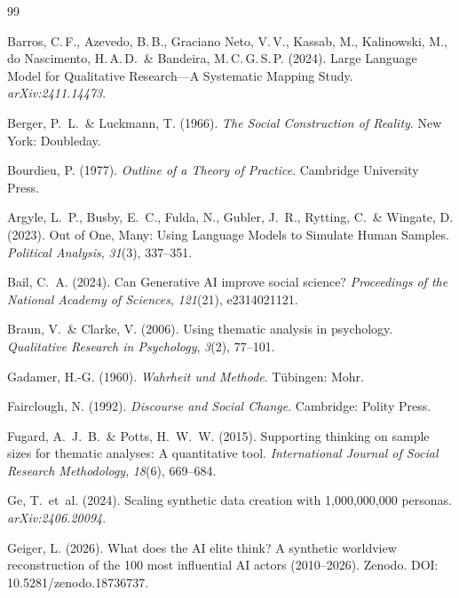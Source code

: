 \documentclass[11pt,a4paper]{article}
\begin{document}

\begin{thebibliography}{99}

  Barros, C.\,F., Azevedo, B.\,B., Graciano Neto, V.\,V., Kassab, M., Kalinowski, M., do Nascimento, H.\,A.\,D.~\& Bandeira, M.\,C.\,G.\,S.\,P. (2024).
  Large Language Model for Qualitative Research---A Systematic Mapping Study.
  \textit{arXiv:2411.14473}.

  Berger, P.~L.~\& Luckmann, T. (1966).
  \textit{The Social Construction of Reality}.
  New York: Doubleday.

  Bourdieu, P. (1977).
  \textit{Outline of a Theory of Practice}.
  Cambridge University Press.

  Argyle, L.~P., Busby, E.~C., Fulda, N., Gubler, J.~R., Rytting, C.~\& Wingate, D. (2023).
  Out of One, Many: Using Language Models to Simulate Human Samples.
  \textit{Political Analysis}, \textit{31}(3), 337--351.

  Bail, C.~A. (2024).
  Can Generative AI improve social science?
  \textit{Proceedings of the National Academy of Sciences}, \textit{121}(21), e2314021121.

  Braun, V.~\& Clarke, V. (2006).
  Using thematic analysis in psychology.
  \textit{Qualitative Research in Psychology}, \textit{3}(2), 77--101.

  Gadamer, H.-G. (1960).
  \textit{Wahrheit und Methode}.
  T\"ubingen: Mohr.

  Fairclough, N. (1992).
  \textit{Discourse and Social Change}.
  Cambridge: Polity Press.

  Fugard, A.~J.~B.~\& Potts, H.~W.~W. (2015).
  Supporting thinking on sample sizes for thematic analyses: A quantitative tool.
  \textit{International Journal of Social Research Methodology}, \textit{18}(6), 669--684.

  Ge, T.~et~al. (2024).
  Scaling synthetic data creation with 1{,}000{,}000{,}000 personas.
  \textit{arXiv:2406.20094}.

  Geiger, L. (2026).
  What does the AI elite think? A synthetic worldview reconstruction of the 100 most influential AI actors (2010--2026).
  Zenodo. DOI: 10.5281/zenodo.18736737.


\end{thebibliography}
\end{document}
